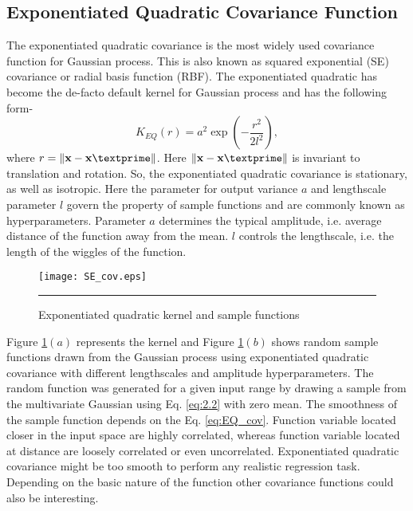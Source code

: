 \subsection{Exponentiated Quadratic Covariance Function}
The exponentiated quadratic covariance is the most widely used covariance function for Gaussian process. This is also known as squared exponential (SE) covariance or radial basis function (RBF). The exponentiated quadratic has become the de-facto default kernel for Gaussian process and has the following form-
\begin{equation} \label{eq:EQ_cov}
K_{EQ}(r)= a^2 \exp \left(-\frac{r^2}{2l^2}\right),
\end{equation}
where $r=\lVert \textbf{x}-\textbf{x}\textprime \rVert$. Here $\lVert \textbf{x}-\textbf{x}\textprime \rVert$ is invariant to translation and rotation. So, the exponentiated quadratic covariance is stationary, as well as isotropic. Here the parameter for output variance $a$ and lengthscale parameter $l$ govern the property of sample functions and are commonly known as hyperparameters. Parameter $a$ determines the typical amplitude, i.e. average distance of the function away from the mean. $l$ controls the lengthscale, i.e. the length of the wiggles of the function. 
\begin{figure}[t]
	\centering
		\texttt{[image: SE\_cov.eps]}
		\rule{35em}{0.5pt}
	\caption[Exponentiated quadratic kernel and sample functions]
		{Exponentiated quadratic kernel and sample functions}
	\label{fig:Exponentiated_Quadratic_covariance}
\end{figure}
Figure \ref{fig:Exponentiated_Quadratic_covariance}$(a)$ represents the kernel and Figure \ref{fig:Exponentiated_Quadratic_covariance}$(b)$ shows random sample functions drawn from the Gaussian process using exponentiated quadratic covariance with different lengthscales and amplitude hyperparameters. The random function was generated for a given input range by drawing a sample from the multivariate Gaussian using Eq. \ref{eq:2.2} with zero mean. The smoothness of the sample function depends on the Eq. \ref{eq:EQ_cov}. Function variable located closer in the input space are highly correlated, whereas function variable located at distance are loosely correlated or even uncorrelated. Exponentiated quadratic covariance might be too smooth to perform any realistic regression task. Depending on the basic nature of the function other covariance functions could also be interesting.

